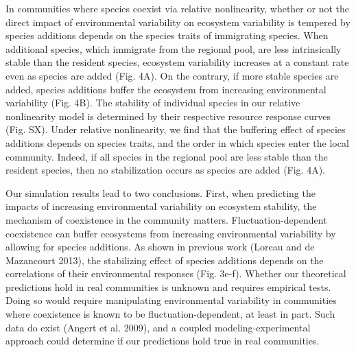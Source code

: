 \documentclass[12pt,]{article}
\begin{document}
In communities where species coexist via relative nonlinearity, whether
or not the direct impact of environmental variability on ecosystem
variability is tempered by species additions depends on the species
traits of immigrating species. When additional species, which immigrate
from the regional pool, are less intrinsically stable than the resident
species, ecosystem variability increases at a constant rate even as
species are added (Fig. 4A). On the contrary, if more stable species are
added, species additions buffer the ecosystem from increasing
environmental variability (Fig. 4B). The stability of individual species
in our relative nonlinearity model is determined by their respective
resource response curves (Fig. SX). Under relative nonlinearity, we find
that the buffering effect of species additions depends on species
traits, and the order in which species enter the local community.
Indeed, if all species in the regional pool are less stable than the
resident species, then no stabilization occurs as species are added
(Fig. 4A).

Our simulation results lead to two conclusions. First, when predicting
the impacts of increasing environmental variability on ecosystem
stability, the mechanism of coexistence in the community matters.
Fluctuation-dependent coexistence can buffer ecosystems from increasing
environmental variability by allowing for species additions. As shown in
previous work (Loreau and {{de Mazancourt}} 2013), the stabilizing
effect of species additions depends on the correlations of their
environmental responses (Fig. 3e-f). Whether our theoretical predictions
hold in real communities is unknown and requires empirical tests. Doing
so would require manipulating environmental variability in communities
where coexistence is known to be fluctuation-dependent, at least in
part. Such data do exist (Angert et al. 2009), and a coupled
modeling-experimental approach could determine if our predictions hold
true in real communities.
\end{document}
